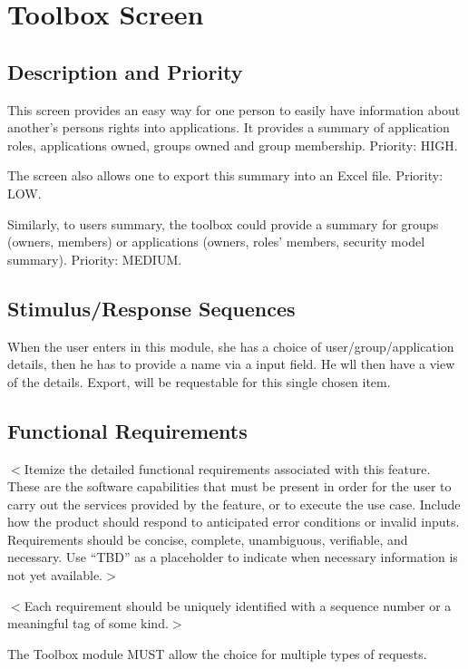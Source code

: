 \documentclass{scrreprt}
\begin{document}
\section{Toolbox Screen}

\subsection{Description and Priority}

This screen provides an easy way for one person to easily have
information about another's persons rights into applications. It
provides a summary of application roles, applications owned, groups
owned and group membership. Priority: HIGH.

The screen also allows one to export this summary into an Excel
file. Priority: LOW.

Similarly, to users summary, the toolbox could provide a summary for
groups (owners, members) or applications (owners, roles' members,
security model summary). Priority: MEDIUM.


\subsection{Stimulus/Response Sequences}

When the user  enters in this module, she has a choice of
user/group/application details, then he has to provide a name via a
input field. He wll then have a view of the details. Export, will be
requestable for this single chosen item.


\subsection{Functional Requirements}
$<$Itemize the detailed functional requirements associated with this feature.  
These are the software capabilities that must be present in order for the user 
to carry out the services provided by the feature, or to execute the use case.  
Include how the product should respond to anticipated error conditions or 
invalid inputs. Requirements should be concise, complete, unambiguous, 
verifiable, and necessary. Use “TBD” as a placeholder to indicate when necessary 
information is not yet available.$>$

$<$Each requirement should be uniquely identified with a sequence number or a 
meaningful tag of some kind.$>$


\begin{reqmt}
The Toolbox module MUST allow the choice for multiple types of requests.
\end{reqmt}
\end{document}
